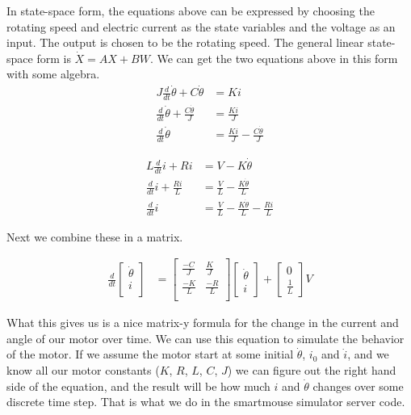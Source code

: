 \documentclass{article}
\begin{document}
In state-space form, the equations above can be expressed by choosing the rotating speed and electric current as the state variables and the voltage as an input. The output is chosen to be the rotating speed. The general linear state-space form is $\dot{X} = AX + BW$. We can get the two equations above in this form with some algebra.
\begin{align}
  J\frac{d}{dt}\dot{\theta} + C\dot{\theta} &= Ki \\
  \frac{d}{dt}\dot{\theta} + \frac{C\dot{\theta}}{J} &= \frac{Ki}{J} \\
  \frac{d}{dt}\dot{\theta} &= \frac{Ki}{J} - \frac{C\dot{\theta}}{J}
\end{align}

\begin{align}
  L\frac{d}{dt}i + Ri &= V - K\dot{\theta} \\
  \frac{d}{dt}i + \frac{Ri}{L} &= \frac{V}{L} - \frac{K\dot{\theta}}{L} \\
  \frac{d}{dt}i &= \frac{V}{L} - \frac{K\dot{\theta}}{L} - \frac{Ri}{L}
\end{align}

Next we combine these in a matrix.

\begin{align}
  \frac{d}{dt}\begin{bmatrix}\dot{\theta}\\i\\\end{bmatrix} &=
    \begin{bmatrix}
      \frac{-C}{J} & \frac{K}{J} \\
      \frac{-K}{L} & \frac{-R}{L} \\
    \end{bmatrix}
    \begin{bmatrix}
      \dot{\theta} \\
      i
    \end{bmatrix}
    +
    \begin{bmatrix}
      0 \\
      \frac{1}{L}
    \end{bmatrix}
    V
\end{align}

What this gives us is a nice matrix-y formula for the change in the current and angle of our motor over time. We can use this equation to simulate the behavior of the motor. If we assume the motor start at some initial $\dot{\theta}$, $i_0$ and $\dot{i}$, and we know all our motor constants ($K$, $R$, $L$, $C$, $J$) we can figure out the right hand side of the equation, and the result will be how much $i$ and $\dot{\theta}$ changes over some discrete time step. That is what we do in the smartmouse simulator server code.
\end{document}
